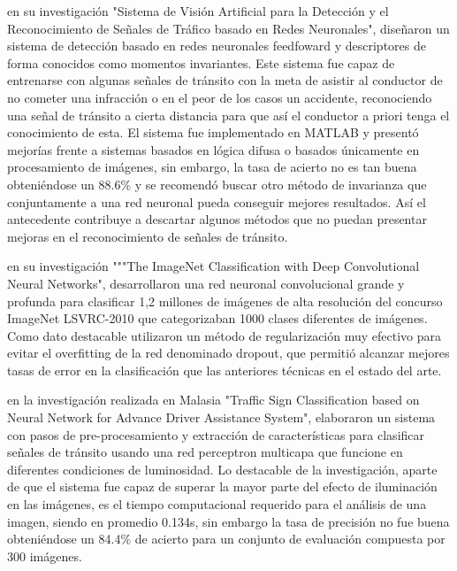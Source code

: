 		\citep{Rocha2010} en su investigación "Sistema de Visión Artificial para la Detección y el Reconocimiento de Señales de Tráfico basado en Redes Neuronales", diseñaron un sistema de detección basado en redes neuronales feedfoward y descriptores de forma conocidos como momentos invariantes. Este sistema fue capaz de entrenarse con algunas señales de tránsito con la meta de asistir al conductor de no cometer una infracción o en el peor de los casos un accidente, reconociendo una señal de tránsito a cierta distancia para que así el conductor a priori tenga el conocimiento de esta. El sistema fue implementado en MATLAB y presentó mejorías frente a sistemas basados en lógica difusa o basados únicamente en procesamiento de imágenes, sin embargo, la tasa de acierto no es tan buena obteniéndose un 88.6\% y se recomendó buscar otro método de invarianza que conjuntamente a una red neuronal pueda conseguir mejores resultados. Así el antecedente contribuye a descartar algunos métodos que no puedan presentar mejoras en el reconocimiento de señales de tránsito.
		\vskip 0.4cm

		\citep{Krizhevsky2012} en su investigación """The ImageNet Classification with Deep Convolutional Neural Networks", desarrollaron una red neuronal convolucional grande y profunda para clasificar 1,2 millones de imágenes de alta resolución del concurso ImageNet LSVRC-2010 que categorizaban 1000 clases diferentes de imágenes. Como dato destacable utilizaron un método de regularización muy efectivo para evitar el overfitting de la red denominado dropout, que permitió alcanzar mejores tasas de error en la clasificación que las anteriores técnicas en el estado del arte.
		\vskip 0.4cm	

		\citep{Hannan2014} en la investigación realizada en Malasia "Traffic Sign Classification based on Neural Network for Advance Driver Assistance System", elaboraron un sistema con pasos de pre-procesamiento y extracción de características para clasificar señales de tránsito usando una red perceptron multicapa que funcione en diferentes condiciones de luminosidad. Lo destacable de la investigación, aparte de que el sistema fue capaz de superar la mayor parte del efecto de iluminación en las imágenes, es el tiempo computacional requerido para el análisis de una imagen, siendo en promedio 0.134s, sin embargo la tasa de precisión no fue buena obteniéndose un 84.4\% de acierto para un conjunto de evaluación compuesta por 300 imágenes. 
		\vskip 0.4cm	

